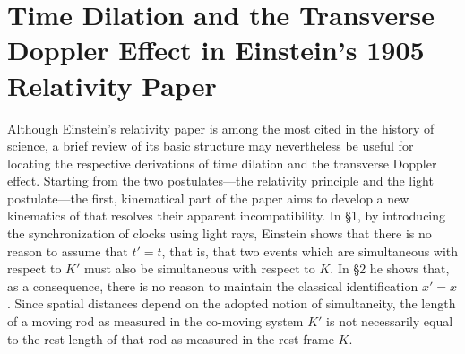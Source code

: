 \documentclass[submitted,12pt]{article} %
\newcommand{\tDe}{transverse Doppler effect\xspace}
\begin{document}
\section{Time Dilation and the Transverse Doppler Effect in Einstein’s 1905 Relativity Paper}
%
Although Einstein’s \citeyear{Einstein1905} relativity paper is among the most cited in the history of science, a brief review of its basic structure may nevertheless be useful for locating the respective derivations of time dilation and the \tDe. Starting from the two postulates—the relativity principle and the light postulate—the first, kinematical part of the paper aims to develop a new kinematics of  \citep[892]{Einstein1905} that resolves their apparent incompatibility. In \S1, by introducing the synchronization of clocks using light rays, Einstein shows that there is no \apr reason to assume that $t'=t$, that is, that two events which are simultaneous with respect to $K'$ must also be simultaneous with respect to $K$. In \S2 he shows that, as a consequence, there is no \apr reason to maintain the classical identification $x'=x$. Since spatial distances depend on the adopted notion of simultaneity, the length of a moving rod as measured in the co-moving system $K'$ is not necessarily equal to the rest length of that rod as measured in the rest frame $K$. 
\end{document}

